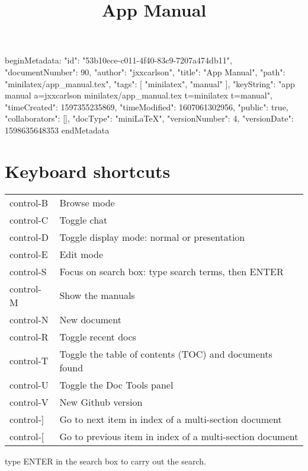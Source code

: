 beginMetadata:
{
    "id": "53b10ece-c011-4f40-83c9-7207a474db11",
    "documentNumber": 90,
    "author": "jxxcarlson",
    "title": "App Manual",
    "path": "minilatex/app_manual.tex",
    "tags": [
        "minilatex",
        "manual"
    ],
    "keyString": "app manual a=jxxcarlson minilatex/app_manual.tex t=minilatex t=manual",
    "timeCreated": 1597355235869,
    "timeModified": 1607061302956,
    "public": true,
    "collaborators": [],
    "docType": "miniLaTeX",
    "versionNumber": 4,
    "versionDate": 1598635648353
}
endMetadata

\title{App Manual}

\maketitle

\tableofcontents

\section{Keyboard shortcuts}


\begin{indent}
\begin{tabular}{ll}
control-B & Browse mode \\
control-C & Toggle chat \\
control-D & Toggle display mode: normal or presentation \\
control-E & Edit mode \\
control-S & Focus on search box: type search terms, then ENTER \\
control-M & Show the manuals \\
control-N & New document \\
control-R & Toggle recent docs \\
control-T & Toggle the table of contents (TOC) and documents found \\
control-U & Toggle the Doc Tools panel \\
control-V & New Github version \\
control-] & Go to next item in index of a multi-section document\\
control-[ & Go to previous item in index of a multi-section document \\
\end{tabular}
\end{indent}

 type ENTER in the search box to carry out the search.  

